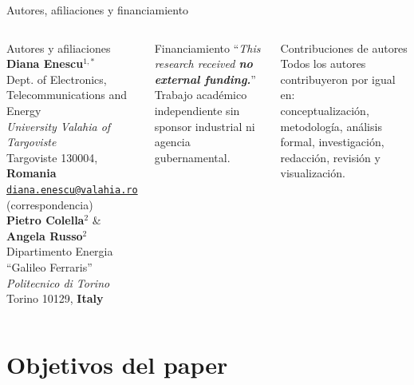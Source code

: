 \documentclass[aspectratio=169]{beamer}
\begin{document}
\begin{frame}{Autores, afiliaciones y financiamiento}
  \begin{columns}[T]
      \begin{block}{Autores y afiliaciones}
        \small
        \textbf{Diana Enescu$^{1,*}$}\\
        Dept. of Electronics, Telecommunications and Energy\\
        \textit{University Valahia of Targoviste}\\
        Targoviste 130004, \textbf{Romania}\\
        \href{mailto:diana.enescu@valahia.ro}
             {\texttt{diana.enescu@valahia.ro}} (correspondencia)\\[0.6em]
        \textbf{Pietro Colella$^{2}$} \& \textbf{Angela Russo$^{2}$}\\
        Dipartimento Energia ``Galileo Ferraris''\\
        \textit{Politecnico di Torino}\\
        Torino 10129, \textbf{Italy}
      \end{block}
      \begin{alertblock}{Financiamiento}
        \small
        ``\textit{This research received \textbf{no external funding.}}''\\[0.5em]
        Trabajo académico independiente sin sponsor industrial ni agencia
        gubernamental.
      \end{alertblock}
      \vspace{0.4em}
      \begin{block}{Contribuciones de autores}
        \small
        Todos los autores contribuyeron por igual en:\\
        conceptualización, metodología, análisis formal, investigación,
        redacción, revisión y visualización.
      \end{block}
  \end{columns}
\end{frame}

\section{Objetivos del paper}
\end{document}
